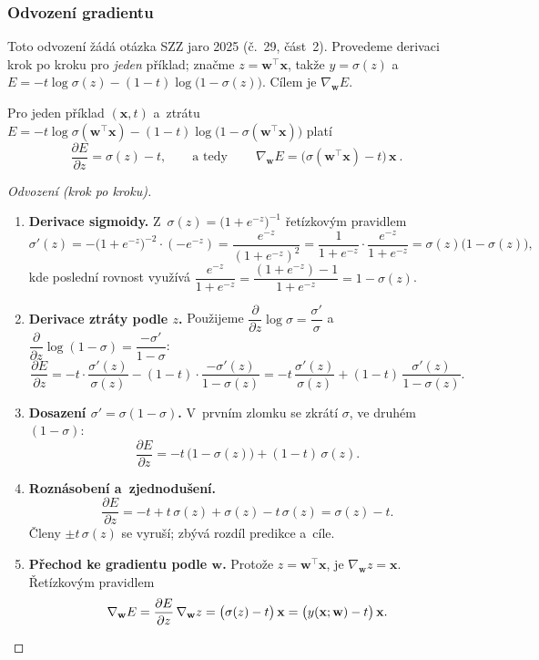 \subsubsection*{Odvození gradientu}

Toto odvození žádá otázka SZZ jaro 2025 (č.~29, část~2). Provedeme derivaci krok po kroku pro \emph{jeden} příklad; značme $z=\mathbf{w}^{\!\top}\mathbf{x}$, takže $y=\sigma(z)$ a~$E=-t\log\sigma(z)-(1-t)\log\big(1-\sigma(z)\big)$. Cílem je $\nabla_{\mathbf{w}}E$.

\begin{veta}
Pro jeden příklad $(\mathbf{x},t)$ a~ztrátu $E=-t\log\sigma(\mathbf{w}^{\!\top}\mathbf{x})-(1-t)\log\big(1-\sigma(\mathbf{w}^{\!\top}\mathbf{x})\big)$ platí
\[ \frac{\partial E}{\partial z}=\sigma(z)-t,\qquad\text{a~tedy}\qquad
   \boxed{\ \nabla_{\mathbf{w}}E=\big(\sigma(\mathbf{w}^{\!\top}\mathbf{x})-t\big)\,\mathbf{x}\ }. \]
\end{veta}

\begin{proof}[Odvození \textnormal{(krok po kroku)}]
\hfill\par
\begin{enumerate}[label=(\arabic*)]
  \item \textbf{Derivace sigmoidy.} Z~$\sigma(z)=\big(1+e^{-z}\big)^{-1}$ řetízkovým pravidlem
    \[ \sigma'(z)=-\big(1+e^{-z}\big)^{-2}\cdot(-e^{-z})=\frac{e^{-z}}{(1+e^{-z})^2}
       =\frac{1}{1+e^{-z}}\cdot\frac{e^{-z}}{1+e^{-z}}=\sigma(z)\big(1-\sigma(z)\big), \]
    kde poslední rovnost využívá $\dfrac{e^{-z}}{1+e^{-z}}=\dfrac{(1+e^{-z})-1}{1+e^{-z}}=1-\sigma(z)$.
  \item \textbf{Derivace ztráty podle $z$.} Použijeme $\dfrac{\partial}{\partial z}\log\sigma=\dfrac{\sigma'}{\sigma}$ a~$\dfrac{\partial}{\partial z}\log(1-\sigma)=\dfrac{-\sigma'}{1-\sigma}$:
    \[ \frac{\partial E}{\partial z}
       = -t\cdot\frac{\sigma'(z)}{\sigma(z)}-(1-t)\cdot\frac{-\sigma'(z)}{1-\sigma(z)}
       = -t\,\frac{\sigma'(z)}{\sigma(z)}+(1-t)\,\frac{\sigma'(z)}{1-\sigma(z)}. \]
  \item \textbf{Dosazení $\sigma'=\sigma(1-\sigma)$.} V~prvním zlomku se zkrátí $\sigma$, ve druhém $(1-\sigma)$:
    \[ \frac{\partial E}{\partial z}
       = -t\,\big(1-\sigma(z)\big)+(1-t)\,\sigma(z). \]
  \item \textbf{Roznásobení a~zjednodušení.}
    \[ \frac{\partial E}{\partial z}
       = -t+t\,\sigma(z)+\sigma(z)-t\,\sigma(z)
       = \sigma(z)-t. \]
    Členy $\pm t\,\sigma(z)$ se vyruší; zbývá rozdíl predikce a~cíle.
  \item \textbf{Přechod ke gradientu podle $\mathbf{w}$.} Protože $z=\mathbf{w}^{\!\top}\mathbf{x}$, je $\nabla_{\mathbf{w}}z=\mathbf{x}$. Řetízkovým pravidlem
    \[ \nabla_{\mathbf{w}}E=\frac{\partial E}{\partial z}\,\nabla_{\mathbf{w}}z=\big(\sigma(z)-t\big)\,\mathbf{x}=\big(y(\mathbf{x};\mathbf{w})-t\big)\,\mathbf{x}. \qedhere \]
\end{enumerate}
\end{proof}

